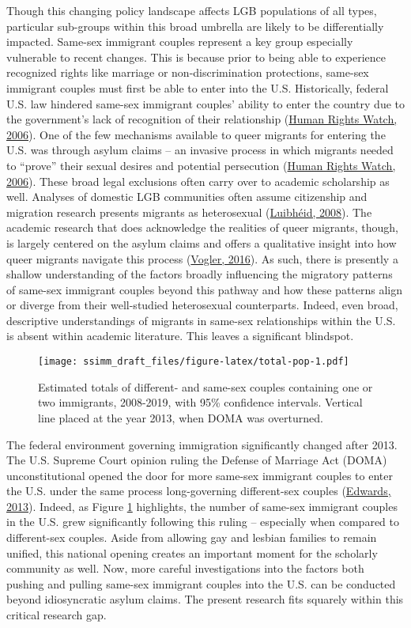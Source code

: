 \documentclass[
  11pt,
]{article}
\begin{document}
Though this changing policy landscape affects LGB populations of all types, particular sub-groups within this broad umbrella are likely to be differentially impacted. Same-sex immigrant couples represent a key group especially vulnerable to recent changes. This is because prior to being able to experience recognized rights like marriage or non-discrimination protections, same-sex immigrant couples must first be able to enter into the U.S. Historically, federal U.S. law hindered same-sex immigrant couples' ability to enter the country due to the government's lack of recognition of their relationship (\protect\hyperlink{ref-humanrightswatch_2006}{Human Rights Watch, 2006}). One of the few mechanisms available to queer migrants for entering the U.S. was through asylum claims -- an invasive process in which migrants needed to ``prove'' their sexual desires and potential persecution (\protect\hyperlink{ref-humanrightswatch_2006}{Human Rights Watch, 2006}). These broad legal exclusions often carry over to academic scholarship as well. Analyses of domestic LGB communities often assume citizenship and migration research presents migrants as heterosexual (\protect\hyperlink{ref-luibheid_2008}{Luibhéid, 2008}). The academic research that does acknowledge the realities of queer migrants, though, is largely centered on the asylum claims and offers a qualitative insight into how queer migrants navigate this process (\protect\hyperlink{ref-vogler_2016}{Vogler, 2016}). As such, there is presently a shallow understanding of the factors broadly influencing the migratory patterns of same-sex immigrant couples beyond this pathway and how these patterns align or diverge from their well-studied heterosexual counterparts. Indeed, even broad, descriptive understandings of migrants in same-sex relationships within the U.S. is absent within academic literature. This leaves a significant blindspot.

\begin{figure}
\centering
\texttt{[image: ssimm\_draft\_files/figure-latex/total-pop-1.pdf]}
\caption{\label{fig:total-pop}Estimated totals of different- and same-sex couples containing one or two immigrants, 2008-2019, with 95\% confidence intervals. Vertical line placed at the year 2013, when DOMA was overturned.}
\end{figure}

The federal environment governing immigration significantly changed after 2013. The U.S. Supreme Court opinion ruling the Defense of Marriage Act (DOMA) unconstitutional opened the door for more same-sex immigrant couples to enter the U.S. under the same process long-governing different-sex couples (\protect\hyperlink{ref-edwards_2013}{Edwards, 2013}). Indeed, as Figure \ref{fig:total-pop} highlights, the number of same-sex immigrant couples in the U.S. grew significantly following this ruling -- especially when compared to different-sex couples. Aside from allowing gay and lesbian families to remain unified, this national opening creates an important moment for the scholarly community as well. Now, more careful investigations into the factors both pushing and pulling same-sex immigrant couples into the U.S. can be conducted beyond idiosyncratic asylum claims. The present research fits squarely within this critical research gap.
\end{document}
